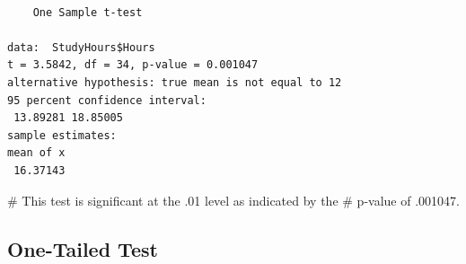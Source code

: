 \documentclass[
  letterpaper,
  DIV=11,
  numbers=noendperiod]{scrreprt}
\newenvironment{Shaded}{\begin{snugshade}}{\end{snugshade}}
\newcommand{\AttributeTok}[1]{\textcolor[rgb]{0.40,0.45,0.13}{#1}}
\newcommand{\CommentTok}[1]{\textcolor[rgb]{0.37,0.37,0.37}{#1}}
\newcommand{\DecValTok}[1]{\textcolor[rgb]{0.68,0.00,0.00}{#1}}
\newcommand{\FunctionTok}[1]{\textcolor[rgb]{0.28,0.35,0.67}{#1}}
\newcommand{\NormalTok}[1]{\textcolor[rgb]{0.00,0.23,0.31}{#1}}
\newcommand{\SpecialCharTok}[1]{\textcolor[rgb]{0.37,0.37,0.37}{#1}}
\newcommand{\StringTok}[1]{\textcolor[rgb]{0.13,0.47,0.30}{#1}}
\begin{document}
\begin{Shaded}
\end{Shaded}

\begin{verbatim}

    One Sample t-test

data:  StudyHours$Hours
t = 3.5842, df = 34, p-value = 0.001047
alternative hypothesis: true mean is not equal to 12
95 percent confidence interval:
 13.89281 18.85005
sample estimates:
mean of x 
 16.37143 
\end{verbatim}

\begin{Shaded}
\begin{Highlighting}[]
\CommentTok{\# This test is significant at the .01 level as indicated by the}
\CommentTok{\# p{-}value of .001047.}
\end{Highlighting}
\end{Shaded}

\subsection{One-Tailed Test}\label{one-tailed-test}
\end{document}
